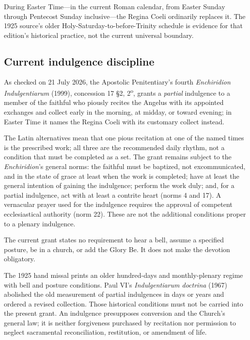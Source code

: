 During Easter Time---in the current Roman calendar, from Easter Sunday through Pentecost Sunday inclusive---the Regina Coeli ordinarily replaces it. The 1925 source's older Holy-Saturday-to-before-Trinity schedule is evidence for that edition's historical practice, not the current universal boundary.

\subsection{Current indulgence discipline}

As checked on 21 July 2026, the Apostolic Penitentiary's fourth \textit{Enchiridion Indulgentiarum} (1999), concession 17 \S2, 2\textsuperscript{o}, grants a \emph{partial} indulgence to a member of the faithful who piously recites the Angelus with its appointed exchanges and collect early in the morning, at midday, or toward evening; in Easter Time it names the Regina Coeli with its customary collect instead.

The Latin alternatives mean that one pious recitation at one of the named times is the prescribed work; all three are the recommended daily rhythm, not a condition that must be completed as a set. The grant remains subject to the \textit{Enchiridion}'s general norms: the faithful must be baptized, not excommunicated, and in the state of grace at least when the work is completed; have at least the general intention of gaining the indulgence; perform the work duly; and, for a partial indulgence, act with at least a contrite heart (norms 4 and 17). A vernacular prayer used for the indulgence requires the approval of competent ecclesiastical authority (norm 22). These are not the additional conditions proper to a plenary indulgence.

The current grant states no requirement to hear a bell, assume a specified posture, be in a church, or add the Glory Be. It does not make the devotion obligatory.

The 1925 hand missal prints an older hundred-days and monthly-plenary regime with bell and posture conditions. Paul VI's \textit{Indulgentiarum doctrina} (1967) abolished the old measurement of partial indulgences in days or years and ordered a revised collection. Those historical conditions must not be carried into the present grant. An indulgence presupposes conversion and the Church's general law; it is neither forgiveness purchased by recitation nor permission to neglect sacramental reconciliation, restitution, or amendment of life.
